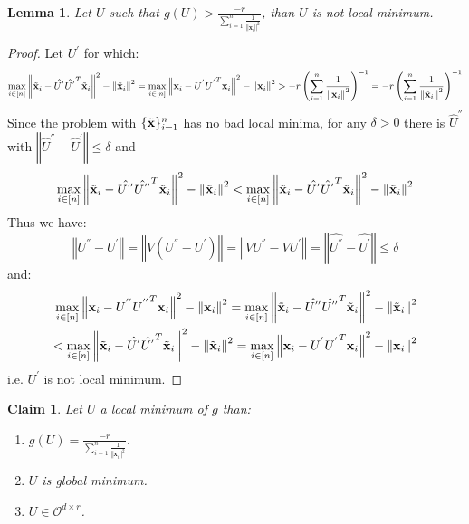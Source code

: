\documentclass{article}
\newtheorem{lemma}[theorem]{Lemma}
\newtheorem{claim}{Claim}
\newcommand{\x}{{\mathbf x}}
\newcommand{\cO}{\mathcal{O}}
\newcommand{\orth}[2]{\cO^{#1\times #2}}
\begin{document}
\begin{lemma}\label{no bad local minima general}
Let $U$ such that $g(U)>\frac{-r}{\sum_{i=1}^n \frac{1}{\left\Vert \x_{i}\right\Vert^{2}}}$, than $U$ is not local minimum.
\end{lemma}
\begin{proof}
Let $U^{'}$ for which: 
$$
\max_{i\in[n]}\left\Vert \Tilde{\x}_i-\hat{U^{'}}\hat{U^{'}}^T\Tilde{\x}_i\right\Vert^2-\left\Vert\Tilde{\x}_i\right\Vert^2=\max_{i\in[n]}\left\Vert\x_i-U^{'}{U^{'}}^T{\x}_i\right\Vert^2-\left\Vert{\x}_i\right\Vert^2 >-r\left({\sum_{i=1}^n \frac{1}{\left\Vert \x_{i}\right\Vert^{2}}}\right)^{-1}=-r\left({\sum_{i=1}^n \frac{1}{\left\Vert \Tilde{\x}_{i}\right\Vert^{2}}}\right)^{-1}
$$ 
Since the problem with $\{\Tilde{\x}\}_{i=1}^n$ has no bad local minima, for any $\delta>0$ there is $\hat{U}^{''}$ with $\left\Vert\hat{U}^{''}-\hat{U}^{'}\right\Vert\le\delta$ and 
$$
\max_{i\in[n]}\left\Vert \Tilde{\x}_i-\hat{U^{''}}\hat{U^{''}}^T\Tilde{\x}_i\right\Vert^2-\left\Vert\Tilde{\x}_i\right\Vert^2 < \max_{i\in[n]}\left\Vert \Tilde{\x}_i-\hat{U^{'}}\hat{U^{'}}^T\Tilde{\x}_i\right\Vert^2-\left\Vert\Tilde{\x}_i\right\Vert^2
$$
Thus we have: 
$$
\left\Vert{U^{''}}-{U^{'}}\right\Vert=\left\Vert V({U^{''}}-{U^{'}})\right\Vert=\left\Vert V{U^{''}}-V{U^{'}}\right\Vert=\left\Vert\hat{U^{''}}-\hat{U^{'}}\right\Vert\le\delta
$$
and:
\begin{align*}
\max_{i\in[n]}\left\Vert {\x}_i-{U^{''}}{U^{''}}^T{\x}_i\right\Vert^2-\left\Vert{\x}_i\right\Vert^2
=\max_{i\in[n]}\left\Vert \Tilde{\x}_i-\hat{U^{''}}\hat{U^{''}}^T\Tilde{\x}_i\right\Vert^2-\left\Vert\Tilde{\x}_i\right\Vert^2\\
< \max_{i\in[n]}\left\Vert \Tilde{\x}_i-\hat{U^{'}}\hat{U^{'}}^T\Tilde{\x}_i\right\Vert^2-\left\Vert\Tilde{\x}_i\right\Vert^2
=\max_{i\in[n]}\left\Vert{\x}_i-{U^{'}}{U^{'}}^T{\x}_i\right\Vert^2-\left\Vert{\x}_i\right\Vert^2
\end{align*}
i.e. $U^{'}$ is not local minimum.

\end{proof}

\begin{claim}\label{general case claims}
Let $U$ a local minimum of $g$ than:
\begin{enumerate}
    \item $g(U)=\frac{-r}{\sum_{i=1}^n \frac{1}{\left\Vert \x_{i}\right\Vert^{2}}}$.
    \item $U$ is global minimum.
    \item $U\in\orth{d}{r}$.
\end{enumerate}
\end{claim}
\end{document}
